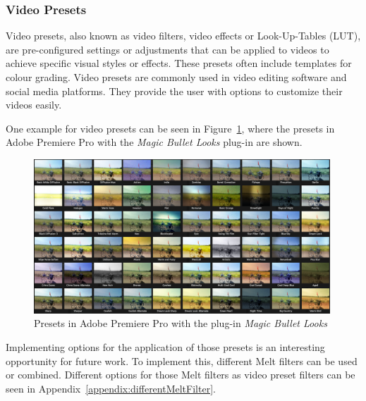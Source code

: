 \documentclass[../MasterThesis.tex]{subfiles}
\begin{document}
\subsubsection*{Video Presets}

Video presets, also known as video filters, video effects or Look-Up-Tables (LUT), are pre-configured settings or adjustments that can be applied to videos to achieve specific visual styles or effects. 
These presets often include templates for colour grading. 
Video presets are commonly used in video editing software and social media platforms. They provide the user with options to customize their videos easily.~\cite{cc1}

One example for video presets can be seen in Figure~\ref{figure:app}, where the presets in Adobe Premiere Pro with the \textit{Magic Bullet Looks} plug-in are shown.~\cite{premierepro, magicbullet}

\begin{figure}[H]
	
	\centering
	
	\includegraphics[width=0.99\textwidth]{app.png}
	
	\caption[Presets in Adobe Premiere Pro (\textit{Magic Bullet Looks})]{Presets in Adobe Premiere Pro with the plug-in \textit{Magic Bullet Looks}~\cite{premierepro, magicbullet}}
	\label{figure:app}
	
\end{figure}

Implementing options for the application of those presets is an interesting opportunity for future work. To implement this, different Melt filters can be used or combined. Different options for those Melt filters as video preset filters can be seen in Appendix~\ref{appendix:differentMeltFilter}.
\end{document}
